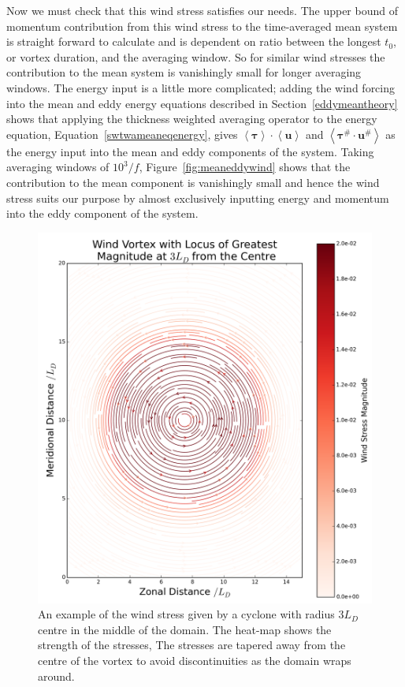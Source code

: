 \documentclass[12pt,a4paper]{report}
\newcommand*\nthkmean[1]{\left\langle{#1}\right\rangle}
\newcommand*\nthkres[1]{{#1}^{\#}}
\newcommand*\figref[1]{Figure~\ref{#1}}
\newcommand*\equref[1]{Equation~\eqref{#1}}
\newcommand*\secref[1]{Section~\ref{#1}}
\begin{document}
Now we must check that this wind stress satisfies our needs. 
The upper bound of momentum contribution from
this wind stress to the time-averaged mean system is straight forward to calculate
and is dependent on ratio between the longest $t_{0}$, or vortex duration, 
and the averaging window. So for similar wind stresses the contribution to the mean system
is vanishingly small for longer averaging windows. The energy input is a little more
complicated; adding the wind forcing into the mean and eddy energy equations described 
in \secref{eddymeantheory} 
shows that applying the thickness weighted averaging operator to 
the energy equation, \equref{swtwameaneqenergy}, gives
$\nthkmean{\boldsymbol{\tau}}\cdot\nthkmean{\boldsymbol{u}}$ and  $\nthkmean{\nthkres{\boldsymbol{\tau}}\cdot\nthkres{\boldsymbol{u}}}$
as the energy input into the mean and eddy components of the system.
Taking averaging windows of $10^{3}/f$, \figref{fig:meaneddywind} shows
that the contribution to the mean component is vanishingly small 
and hence the wind stress suits our purpose by almost exclusively 
inputting energy and momentum into the eddy component of the system.


\begin{figure}[t]
	\centering
	\begin{minipage}{0.55\linewidth}
		\includegraphics[width=\linewidth]{WindStressEg}
	\end{minipage}
	\quad
	\begin{minipage}{0.3\linewidth}
		\caption{An example of the wind stress given by a cyclone with
			radius $3 L_{D}$ centre in the middle of the domain. 
			The heat-map shows the strength of the stresses, 
			The  stresses are tapered away from the centre of the vortex to
			avoid discontinuities as the domain wraps around. }
		\label{fig:WindEg}
	\end{minipage}
\end{figure}
\end{document}
